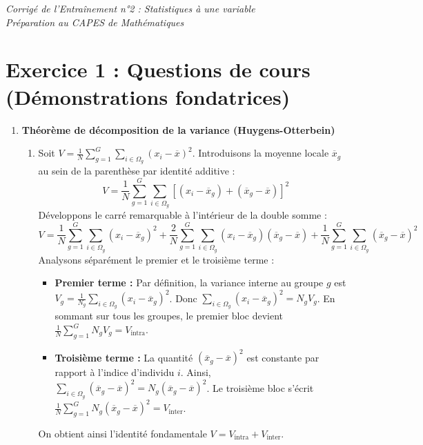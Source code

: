 \documentclass[11pt,a4paper]{article}
\begin{document}
\newpage

\begin{center}
\textit{Corrigé de l'Entraînement n°2 : Statistiques à une variable\\\large Préparation au CAPES de Mathématiques}
\end{center}

\section*{Exercice 1 : Questions de cours (Démonstrations fondatrices)}

\begin{enumerate}
    \item \textbf{Théorème de décomposition de la variance (Huygens-Otterbein)}
    \begin{enumerate}
        \item Soit $V = \frac{1}{N}\sum_{g=1}^G \sum_{i \in \Omega_g} (x_i - \overline{x})^2$. Introduisons la moyenne locale $\overline{x}_g$ au sein de la parenthèse par identité additive :
        \[ V = \frac{1}{N}\sum_{g=1}^G \sum_{i \in \Omega_g} \left[ (x_i - \overline{x}_g) + (\overline{x}_g - \overline{x}) \right]^2 \]
        Développons le carré remarquable à l'intérieur de la double somme :
        \[ V = \frac{1}{N}\sum_{g=1}^G \sum_{i \in \Omega_g} (x_i - \overline{x}_g)^2 + \frac{2}{N}\sum_{g=1}^G \sum_{i \in \Omega_g} (x_i - \overline{x}_g)(\overline{x}_g - \overline{x}) + \frac{1}{N}\sum_{g=1}^G \sum_{i \in \Omega_g} (\overline{x}_g - \overline{x})^2 \]
        Analysons séparément le premier et le troisième terme :
        \begin{itemize}
            \item \textbf{Premier terme :} Par définition, la variance interne au groupe $g$ est $V_g = \frac{1}{N_g}\sum_{i \in \Omega_g} (x_i - \overline{x}_g)^2$. Donc $\sum_{i \in \Omega_g} (x_i - \overline{x}_g)^2 = N_g V_g$. En sommant sur tous les groupes, le premier bloc devient $\frac{1}{N}\sum_{g=1}^G N_g V_g = V_{\text{intra}}$.
            \item \textbf{Troisième terme :} La quantité $(\overline{x}_g - \overline{x})^2$ est constante par rapport à l'indice d'individu $i$. Ainsi, $\sum_{i \in \Omega_g} (\overline{x}_g - \overline{x})^2 = N_g (\overline{x}_g - \overline{x})^2$. Le troisième bloc s'écrit $\frac{1}{N}\sum_{g=1}^G N_g (\overline{x}_g - \overline{x})^2 = V_{\text{inter}}$.
        \end{itemize}
        On obtient ainsi l'identité fondamentale $V = V_{\text{intra}} + V_{\text{inter}}$.
        

\end{enumerate}
\end{enumerate}
\end{document}
